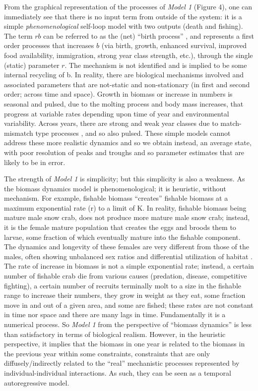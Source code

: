 \documentclass[
	letterpaper, %
	10pt, %
]{article}
\begin{document}
From the graphical representation of the processes of \emph{Model 1} (Figure
4), one can immediately see that there is no input term from outside
of the system: it is a simple \emph{phenomenological} self-loop model
with two outputs (death and fishing). The term 
$\mathit{rb}$ can be referred to as the (net) ``birth process'' \cite{Gillespie_1992, Qian_Bishop_2010, Albert_2016},
and represents a first order processes that increases 
$b$ (via birth, growth, enhanced survival, improved food availability,
immigration, strong year class strength, etc.), through the single
(static) parameter $r$. The mechanism is not identified and is 
implied to be some internal
recycling of b. In reality, there are biological mechanisms involved
and associated parameters that are not-static and non-stationary (in
first and second order; across time and space). Growth in biomass
or increase in numbers is seasonal and pulsed, due to the molting
process and body mass increases, that progress at variable rates depending
upon time of year and environmental variability. Across years, there
are strong and weak year classes due to match-mismatch type processes
\cite{Cushing_1969, Durant_et_al_2007},
and so also pulsed. These simple models cannot address these more
realistic dynamics and so we obtain instead, an average state, with
poor resolution of peaks and troughs and so parameter estimates that
are likely to be in error.

The strength of \emph{Model 1} is simplicity; but this simplicity
is also a weakness. As the biomass dynamics model is phenomenological;
it is heuristic, without mechanism. For example, fishable biomass
``creates'' fishable biomass at a maximum exponential rate (r) to
a limit of K. In reality, fishable biomass being mature male snow
crab, does not produce more mature male snow crab; instead, it is
the female mature population that creates the eggs and broods them
to larvae, some fraction of which eventually mature into the fishable
component. The dynamics and longevity of these females are very different
from those of the males, often showing unbalanced sex ratios and differential
utilization of habitat \cite{Choi_et_al_2022}.
The rate of increase in biomass is not a simple exponential rate;
instead, a certain number of fishable crab die from various causes
(predation, disease, competitive fighting), a certain number of recruits
terminally molt to a size in the fishable range to increase their
numbers, they grow in weight as they eat, some fraction move in and
out of a given area, and some are fished; these rates are not constant
in time nor space and there are many lags in time. Fundamentally it
is a numerical process. So \emph{Model 1} from the perspective of ``biomass
dynamics'' is less than satisfactory in terms of biological realism.
However, in the heuristic perspective, it implies that the biomass
in one year is related to the biomass in the previous year within
some constraints, constraints that are only diffusely/indirectly related
to the ``real'' mechanistic processes represented by individual-individual
interactions. As such, they can be seen as a temporal autoregressive
model.
\end{document}
